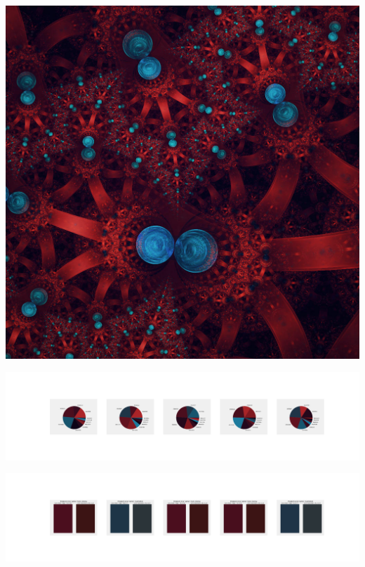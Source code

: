 \documentclass[11pt]{article}
\begin{document}
\begin{landscape}
    \begin{center}
    \includegraphics[width=\textwidth]{./nbimg/file (159).jpg}
    \end{center}

    \begin{center}
    \includegraphics[width=250mm]{./nbimg/pie-66.jpg}
    \end{center}

    \begin{center}
    \includegraphics[width=250mm]{./nbimg/peak-66.jpg}
    \end{center}
    


\end{landscape}
\end{document}
